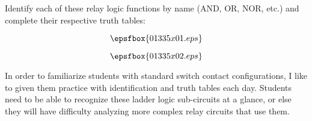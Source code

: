 

Identify each of these relay logic functions by name (AND, OR, NOR, etc.) and complete their respective truth tables:

$$\epsfbox{01335x01.eps}$$







$$\epsfbox{01335x02.eps}$$







In order to familiarize students with standard switch contact configurations, I like to given them practice with identification and truth tables each day.  Students need to be able to recognize these ladder logic sub-circuits at a glance, or else they will have difficulty analyzing more complex relay circuits that use them.




